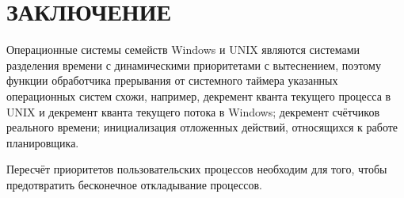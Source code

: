 \chapter*{ЗАКЛЮЧЕНИЕ}

Операционные системы семейств Windows и UNIX являются системами разделения времени
с динамическими приоритетами с вытеснением, поэтому
функции 
обработчика прерывания от системного таймера указанных операционных
систем схожи,
например, декремент кванта текущего процесса
в UNIX и декремент кванта текущего потока в Windows; 
декремент счётчиков реального времени; инициализация отложенных действий,
относящихся к работе планировщика.

Пересчёт приоритетов пользовательских процессов необходим для того,
чтобы предотвратить бесконечное откладывание процессов.
